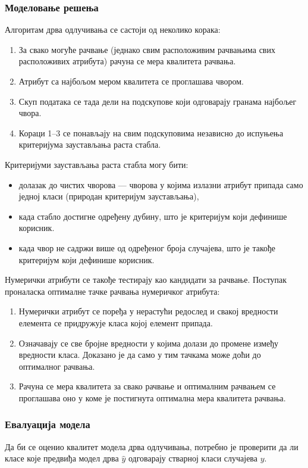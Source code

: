 \subsubsection{Моделовање решења}
Алгоритам дрва одлучивања се састоји од неколико корака:

\begin{enumerate}
  \item За свако могуће рачвање (једнако свим расположивим рачвањима свих расположивих атрибута) рачуна се мера квалитета рачвања.
  \item Атрибут са најбољом мером квалитета се проглашава чвором.
  \item Скуп података се тада дели на подскупове који одговарају гранама најбољег чвора.
  \item Кораци 1--3 се понављају на свим подскуповима независно до испуњења критеријума заустављања раста стабла.
\end{enumerate}
Критеријуми заустављања раста стабла могу бити:

\begin{itemize}
  \item долазак до чистих чворова — чворова у којима излазни атрибут припада само једној класи (природан критеријум заустављања),
  \item када стабло достигне одређену дубину, што је критеријум који дефинише корисник.
  \item када чвор не садржи више од одређеног броја случајева, што је такође критеријум који дефинише корисник.
\end{itemize}
Нумерички атрибути се такође тестирају као кандидати за рачвање. Поступак проналаска оптималне тачке рачвања нумеричког атрибута:

\begin{enumerate}
  \item Нумерички атрибут се поређа у нерастући редослед и свакој вредности елемента се придружује класа којој елемент припада.
  \item Означавају се све бројне вредности у којима долази до промене између вредности класа. Доказано је да само у тим тачкама може доћи до оптималног рачвања.
  \item Рачуна се мера квалитета за свако рачвање и оптималним рачвањем се проглашава оно у коме је постигнута оптимална мера квалитета рачвања.
\end{enumerate}

\subsubsection{Евалуација модела}
Да би се оценио квалитет модела дрва одлучивања, потребно је проверити да ли класе које предвиђа модел дрва $\hat{y}$ одговарају стварној класи случајева $y$.

